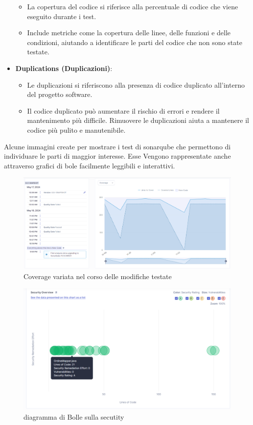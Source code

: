 \begin{itemize}
\begin{itemize}
        \item La copertura del codice si riferisce alla percentuale di codice che viene eseguito durante i test.
        \item Include metriche come la copertura delle linee, delle funzioni e delle condizioni, aiutando a identificare le parti del codice che non sono state testate.
    \end{itemize}
    \item \textbf{Duplications (Duplicazioni)}:
    \begin{itemize}
        \item Le duplicazioni si riferiscono alla presenza di codice duplicato all'interno del progetto software.
        \item Il codice duplicato può aumentare il rischio di errori e rendere il mantenimento più difficile. Rimuovere le duplicazioni aiuta a mantenere il codice più pulito e manutenibile.
    \end{itemize}
\end{itemize}

\newpage
Alcune immagini create per mostrare i test di sonarqube che permettono di individuare le parti di maggior interesse.
Esse Vengono rappresentate anche attraverso grafici di bole facilmente leggibili e interattivi.

\begin{figure}[htbp]
	\centering
	\includegraphics[scale=0.35]{iterazione1/images/coverage_percent_modifier.png}
	\caption{Coverage variata nel corso delle modifiche testate\label{fig:coverage percent modifier}}
\end{figure}

\begin{figure}[htbp]
	\centering
	\includegraphics[scale=0.50]{iterazione1/images/secutiry.png}
	\caption{diagramma di Bolle sulla secutity\label{fig:security}}
\end{figure}

